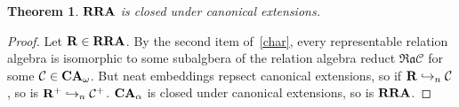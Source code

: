 \documentclass[a4paper]{article}
\theoremstyle{defin}
\theoremstyle{theorem}
\newtheorem{theorem}{Theorem}
\theoremstyle{prop}
\theoremstyle{lemma}
\theoremstyle{fact}
\theoremstyle{ex}
\theoremstyle{col}
\begin{document}
\begin{theorem}
  ${\bf RRA}$ is closed under canonical extensions.
\end{theorem}

\begin{proof} Let ${\bf R} \in {\bf RRA}$.
  By the second item of~\ref{char}, every representable relation algebra is isomorphic to some subalgbera of the relation algebra reduct $\mathfrak{Ra}\mathcal{C}$ for some $\mathcal{C} \in {\bf CA}_{\omega}$. But neat embeddings repsect canonical extensions, so if ${\bf R} \hookrightarrow_{n} \mathcal{C}$, so is ${\bf R}^{+} \hookrightarrow_{n} \mathcal{C}^{+}$.
  ${\bf CA}_{\alpha}$ is closed under canonical extensions, so is ${\bf RRA}$.
\end{proof}




\end{document}
